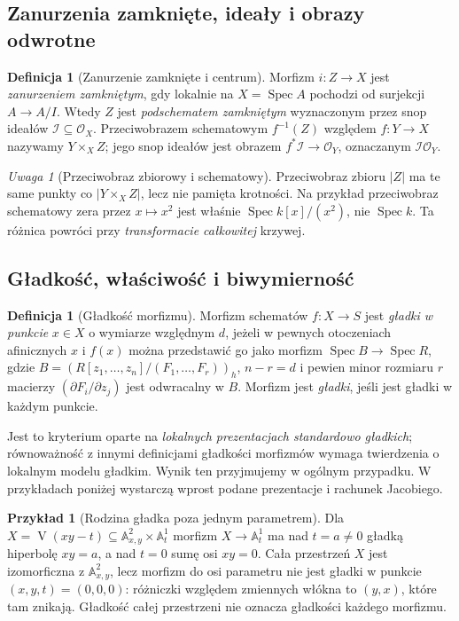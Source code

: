 \documentclass[11pt,a4paper,openany]{report}
\numberwithin{equation}{section}
\theoremstyle{plain}
\theoremstyle{definition}
\newtheorem{definicja}[twierdzenie]{Definicja}
\newtheorem{przyklad}[twierdzenie]{Przykład}
\theoremstyle{remark}
\newtheorem{uwaga}[twierdzenie]{Uwaga}
\newcommand{\A}{\mathbb A}
\newcommand{\V}{\operatorname V}
\newcommand{\Spec}{\operatorname{Spec}}
\begin{document}
\subsection{Zanurzenia zamknięte, ideały i obrazy odwrotne}

\begin{definicja}[Zanurzenie zamknięte i centrum]
Morfizm $i:Z\to X$ jest \emph{zanurzeniem zamkniętym}, gdy
lokalnie na $X=\Spec A$ pochodzi od surjekcji $A\to A/I$.
Wtedy $Z$ jest \emph{podschematem zamkniętym} wyznaczonym
przez snop ideałów $\mathcal I\subseteq\mathcal O_X$.
Przeciwobrazem schematowym $f^{-1}(Z)$ względem $f:Y\to X$
nazywamy $Y\times_X Z$; jego snop ideałów jest
obrazem $f^*\mathcal I\to\mathcal O_Y$, oznaczanym
$\mathcal I\mathcal O_Y$.
\end{definicja}

\begin{uwaga}[Przeciwobraz zbiorowy i schematowy]
Przeciwobraz zbioru $|Z|$ ma te same punkty co
$|Y\times_X Z|$, lecz nie pamięta krotności. Na przykład
przeciwobraz schematowy zera przez $x\mapsto x^2$
jest właśnie $\Spec k[x]/(x^2)$, nie $\Spec k$.
Ta różnica powróci przy \emph{transformacie całkowitej} krzywej.
\end{uwaga}

\subsection{Gładkość, właściwość i biwymierność}

\begin{definicja}[Gładkość morfizmu]
\label{def:ga5-smooth}
Morfizm schematów $f:X\to S$ jest \emph{gładki w punkcie}
$x\in X$ o wymiarze względnym $d$, jeżeli w pewnych otoczeniach
afinicznych $x$ i $f(x)$ można przedstawić go jako morfizm
$\Spec B\to\Spec R$, gdzie
$B=(R[z_1,\ldots,z_n]/(F_1,\ldots,F_r))_h$,
$n-r=d$ i pewien minor rozmiaru $r$ macierzy
$(\partial F_i/\partial z_j)$ jest odwracalny w $B$.
Morfizm jest \emph{gładki}, jeśli jest gładki w każdym punkcie.
\end{definicja}

Jest to kryterium oparte na \emph{lokalnych prezentacjach
standardowo gładkich}; równoważność z innymi definicjami gładkości
morfizmów wymaga twierdzenia o lokalnym modelu gładkim.
Wynik ten przyjmujemy w ogólnym przypadku. W przykładach poniżej
wystarczą wprost podane prezentacje i rachunek Jacobiego.

\begin{przyklad}[Rodzina gładka poza jednym parametrem]
Dla $X=\V(xy-t)\subseteq\A^2_{x,y}\times\A^1_t$
morfizm $X\to\A^1_t$ ma nad $t=a\ne0$ gładką hiperbolę
$xy=a$, a nad $t=0$ sumę osi $xy=0$. Cała przestrzeń $X$
jest izomorficzna z $\A^2_{x,y}$, lecz morfizm do osi parametru
nie jest gładki w punkcie $(x,y,t)=(0,0,0)$: różniczki
względem zmiennych włókna to $(y,x)$, które tam znikają.
Gładkość całej przestrzeni nie oznacza gładkości każdego morfizmu.
\end{przyklad}
\end{document}
